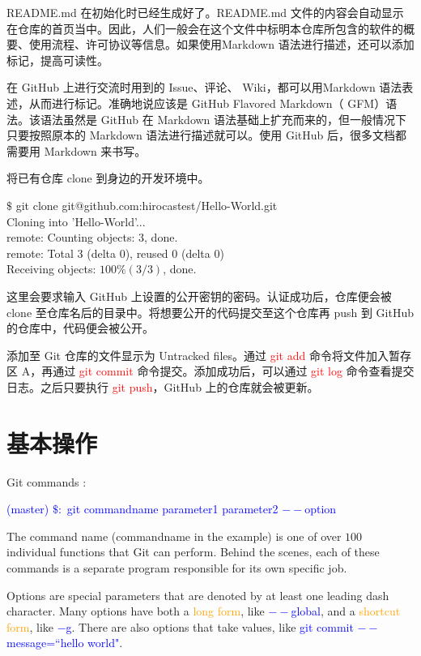 \documentclass[12pt,a4paper]{article}
\begin{document}
README.md 在初始化时已经生成好了。README.md 文件的内容会自动显示在仓库的首页当中。因此，人们一般会在这个文件中标明本仓库所包含的软件的概要、使用流程、许可协议等信息。如果使用Markdown 语法进行描述，还可以添加标记，提高可读性。

在 GitHub 上进行交流时用到的 Issue、评论、 Wiki，都可以用Markdown 语法表述，从而进行标记。准确地说应该是 GitHub Flavored Markdown（ GFM）语法。该语法虽然是 GitHub 在 Markdown 语法基础上扩充而来的，但一般情况下只要按照原本的 Markdown 语法进行描述就可以。使用 GitHub 后，很多文档都需要用 Markdown 来书写。

将已有仓库 clone 到身边的开发环境中。
\begin{tcolorbox}[colback=green!5,colframe=green!40!black,title= ]
$\$$ git clone git@github.com:hirocastest/Hello-World.git \\
Cloning into 'Hello-World'... \\
remote: Counting objects: 3, done. \\
remote: Total 3 (delta 0), reused 0 (delta 0) \\
Receiving objects: $100\% (3/3)$, done.
\end{tcolorbox}
这里会要求输入 GitHub 上设置的公开密钥的密码。认证成功后，仓库便会被 clone 至仓库名后的目录中。将想要公开的代码提交至这个仓库再 push 到 GitHub 的仓库中，代码便会被公开。

添加至 Git 仓库的文件显示为 Untracked files。通过 \textcolor{red}{git add} 命令将文件加入暂存区 A，再通过 \textcolor{red}{git commit} 命令提交。添加成功后，可以通过 \textcolor{red}{git log} 命令查看提交日志。之后只要执行 \textcolor{red}{git push}，GitHub 上的仓库就会被更新。



\section{基本操作}
\cite{demaree2016git} Git commands :
\begin{tcolorbox}[colback=green!5,colframe=green!40!black,title= ]
\textcolor{blue}{(master) $\$:$ git commandname parameter1 parameter2 $--$option}
\end{tcolorbox}
The command name (commandname in the example) is one of over $100$ individual functions that Git can perform. Behind the scenes, each of these commands is a separate program responsible for its own specific job. 

Options are special parameters that are denoted by at least one leading dash character. Many options have both a \textcolor{orange}{long form}, like \textcolor{blue}{$--$global}, and a \textcolor{orange}{shortcut form}, like \textcolor{blue}{$-$g}. There are also options that take values, like \textcolor{blue}{git commit $--$message=``hello world"}.
\end{document}
